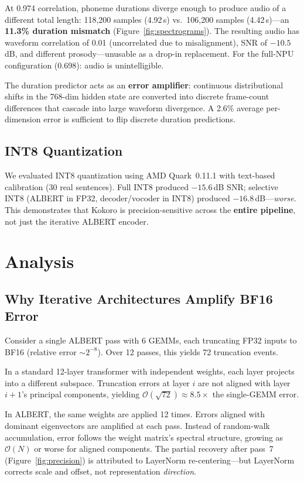 \documentclass[11pt]{article}
\begin{document}
At 0.974 correlation, phoneme durations diverge enough to produce audio of a different total length: 118,200 samples (4.92\,s) vs.\ 106,200 samples (4.42\,s)---an \textbf{11.3\% duration mismatch} (Figure~\ref{fig:spectrograms}). The resulting audio has waveform correlation of 0.01 (uncorrelated due to misalignment), SNR of $-10.5$\,dB, and different prosody---unusable as a drop-in replacement. For the full-NPU configuration (0.698): audio is unintelligible.

The duration predictor acts as an \textbf{error amplifier}: continuous distributional shifts in the 768-dim hidden state are converted into discrete frame-count differences that cascade into large waveform divergence. A 2.6\% average per-dimension error is sufficient to flip discrete duration predictions.

\subsection{INT8 Quantization}

We evaluated INT8 quantization using AMD Quark~0.11.1 with text-based calibration (30 real sentences). Full INT8 produced $-15.6$\,dB SNR; selective INT8 (ALBERT in FP32, decoder/vocoder in INT8) produced $-16.8$\,dB---\emph{worse}. This demonstrates that Kokoro is precision-sensitive across the \textbf{entire pipeline}, not just the iterative ALBERT encoder.

\section{Analysis}

\subsection{Why Iterative Architectures Amplify BF16 Error}

Consider a single ALBERT pass with 6 GEMMs, each truncating FP32 inputs to BF16 (relative error ${\sim}2^{-8}$). Over 12 passes, this yields 72 truncation events.

In a standard 12-layer transformer with independent weights, each layer projects into a different subspace. Truncation errors at layer $i$ are not aligned with layer $i{+}1$'s principal components, yielding $\mathcal{O}(\sqrt{72}) \approx 8.5\times$ the single-GEMM error.

In ALBERT, the same weights are applied 12 times. Errors aligned with dominant eigenvectors are amplified at each pass. Instead of random-walk accumulation, error follows the weight matrix's spectral structure, growing as $\mathcal{O}(N)$ or worse for aligned components. The partial recovery after pass~7 (Figure~\ref{fig:precision}) is attributed to LayerNorm re-centering---but LayerNorm corrects scale and offset, not representation \emph{direction}.
\end{document}
